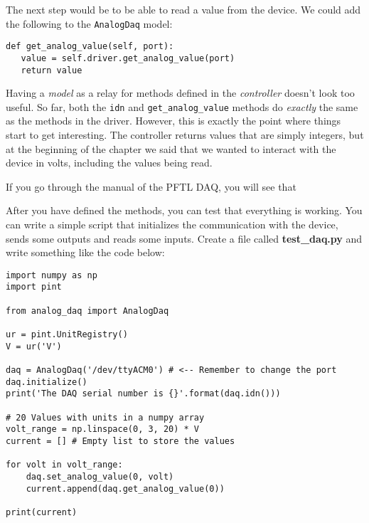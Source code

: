 The next step would be to be able to read a value from the device. We could add the following to the \texttt{AnalogDaq} model:

\begin{verbatim}
def get_analog_value(self, port):
   value = self.driver.get_analog_value(port)
   return value
\end{verbatim}

Having a \emph{model} as a relay for methods defined in the \emph{controller} doesn't look too useful. So far, both the \texttt{idn} and \texttt{get_analog_value} methods do \emph{exactly} the same as the methods in the driver. However, this is exactly the point where things start to get interesting. The controller returns values that are simply integers, but at the beginning of the chapter we said that we wanted to interact with the device in volts, including the values being read. 

If you go through the manual of the {PFTL DAQ}, you will see that 



After you have defined the methods, you can test that everything is
working. You can write a simple script that initializes the
communication with the device, sends some outputs and reads some inputs.
Create a file called \textbf{test\_daq.py} and write something like the
code below:

\begin{verbatim}
import numpy as np
import pint

from analog_daq import AnalogDaq

ur = pint.UnitRegistry()
V = ur('V')

daq = AnalogDaq('/dev/ttyACM0') # <-- Remember to change the port
daq.initialize()
print('The DAQ serial number is {}'.format(daq.idn()))

# 20 Values with units in a numpy array
volt_range = np.linspace(0, 3, 20) * V 
current = [] # Empty list to store the values

for volt in volt_range:
    daq.set_analog_value(0, volt)
    current.append(daq.get_analog_value(0))

print(current)
\end{verbatim}

